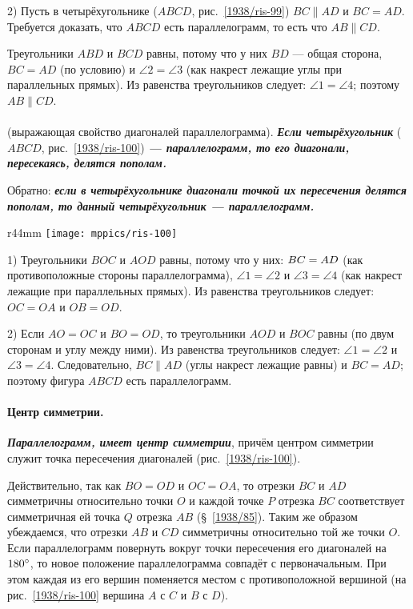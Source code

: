 2) Пусть в четырёхугольнике ($ABCD$, рис.~\ref{1938/ris-99}) $BC\parallel AD$ и $BC = AD$.
Требуется доказать, что $ABCD$ есть параллелограмм, то есть что $AB \parallel CD$.

Треугольники $ABD$ и $BCD$ равны, потому что у них $BD$ — общая сторона, $BC = AD$ (по условию) и $\angle 2 = \angle 3$ (как накрест лежащие углы при параллельных прямых).
Из равенства треугольников следует:
$\angle 1 = \angle 4$;
поэтому $AB\parallel CD$.

\paragraph{}\label{1938/90}
 (выражающая свойство диагоналей параллелограмма).
\textbf{\emph{Если четырёхугольник}} ($ABCD$, рис.~\ref{1938/ris-100}) \textbf{\emph{— параллелограмм, то его диагонали, пересекаясь, делятся пополам.}}

Обратно:
\textbf{\emph{если в четырёхугольнике диагонали точкой их пересечения делятся пополам, то данный четырёхугольник — параллелограмм.}}

{

\begin{wrapfigure}{r}{44mm}
\vskip-4mm
\centering
\texttt{[image: mppics/ris-100]}
\caption{}\label{1938/ris-100}
\end{wrapfigure}

1) Треугольники $BOC$ и $AOD$ равны, потому что у них:
$BC\z=AD$ (как противоположные стороны параллелограмма), $\angle 1 = \angle 2$ и $\angle 3 = \angle 4$ (как накрест лежащие при параллельных прямых).
Из равенства треугольников следует:
$OC=OA$ и $OB=OD$.


2) Если $AO=OC$ и $BO=OD$, то треугольники $AOD$ и $BOC$ равны (по двум сторонам и углу между ними).
Из равенства треугольников следует:
$\angle 1 = \angle 2$ и $\angle 3 = \angle 4$.
Следовательно, $BC \parallel AD$ (углы накрест лежащие равны) и $BC=AD$;
поэтому фигура $ABCD$ есть параллелограмм.

}

\paragraph{Центр симметрии.}\label{1938/91}
\textbf{\emph{Параллелограмм, имеет центр симметрии}}, причём центром симметрии служит точка пересечения диагоналей (рис.~\ref{1938/ris-100}).

Действительно, так как $BO=OD$ и $OC=OA$, то отрезки $BC$ и $AD$ симметричны относительно точки $O$ и каждой точке $P$ отрезка $BC$ соответствует симметричная ей точка $Q$ отрезка $AB$ (§~\ref{1938/85}).
Таким же образом убеждаемся, что отрезки $AB$ и $CD$ симметричны относительно той же точки $O$.
Если параллелограмм повернуть вокруг точки пересечения его диагоналей на $180\degree$, то новое положение параллелограмма совпадёт с первоначальным.
При этом каждая из его вершин поменяется местом с противоположной вершиной 
(на рис.~\ref{1938/ris-100} вершина $A$ с $C$ и $B$ с $D$).

